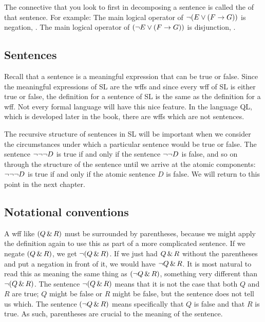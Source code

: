 The connective that you look to first in decomposing a sentence is called the  of that sentence. For example: The main logical operator of $\neg (E \vee (F \rightarrow G))$ is negation, \enot. The main logical operator of $(\neg E \vee (F \rightarrow G))$ is disjunction, \eor.


\subsection{Sentences}
Recall that a sentence is a meaningful expression that can be true or false. Since the meaningful expressions of SL are the wffs and since every wff of SL is either true or false, the definition for a sentence of SL is the same as the definition for a wff. Not every formal language will have this nice feature. In the language QL, which is developed later in the book, there are wffs which are not sentences. 

The recursive structure of sentences in SL will be important when we consider the circumstances under which a particular sentence would be true or false. The sentence $\neg \neg \neg D$ is true if and only if the sentence $\neg \neg D$ is false, and so on through the structure of the sentence until we arrive at the atomic components: $\neg \neg \neg D$ is true if and only if the atomic sentence $D$ is false. We will return to this point in the next chapter.




\subsection{Notational conventions}
\label{SLconventions}
A wff like $(Q \,\&\, R)$ must be surrounded by parentheses, because we might apply the definition again to use this as part of a more complicated sentence. If we negate $(Q \,\&\, R)$, we get $\neg(Q \,\&\, R)$. If we just had $Q \,\&\, R$ without the parentheses and put a negation in front of it, we would have $\neg Q \,\&\, R$. It is most natural to read this as meaning the same thing as $(\neg Q \,\&\, R)$, something very different than $\neg(Q\,\&\, R)$. The sentence $\neg(Q \,\&\, R)$ means that it is not the case that both $Q$ and $R$ are true; $Q$ might be false or $R$ might be false, but the sentence does not tell us which. The sentence $(\neg Q \,\&\, R)$ means specifically that $Q$ is false and that $R$ is true. As such, parentheses are crucial to the meaning of the sentence.

